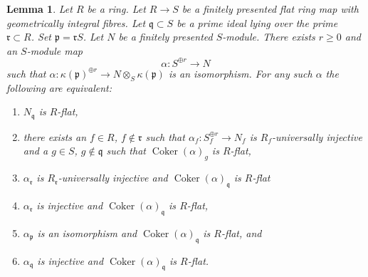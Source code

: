 \documentclass{amsart}
\theoremstyle{plain}
\newtheorem{lemma}[subsection]{Lemma}
\theoremstyle{definition}
\theoremstyle{remark}
\numberwithin{equation}{subsection}
\def\Coker{\mathop{\mathrm{Coker}}}
\begin{document}
\begin{lemma}
\label{lemma-induction-step-fp}
Let $R$ be a ring. Let $R \to S$ be a finitely presented
flat ring map with geometrically integral fibres. Let
$\mathfrak q \subset S$ be a prime ideal lying over the prime
$\mathfrak r \subset R$. Set $\mathfrak p = \mathfrak r S$.
Let $N$ be a finitely presented $S$-module.
There exists $r \geq 0$ and an $S$-module map
$$
\alpha : S^{\oplus r} \longrightarrow N
$$
such that
$\alpha : \kappa(\mathfrak p)^{\oplus r} \to N \otimes_S \kappa(\mathfrak p)$
is an isomorphism. For any such $\alpha$ the following are equivalent:
\begin{enumerate}
\item $N_{\mathfrak q}$ is $R$-flat,
\item there exists an $f \in R$, $f \not \in \mathfrak r$ such that
$\alpha_f : S_f^{\oplus r} \to N_f$ is $R_f$-universally injective and
a $g \in S$, $g \not \in \mathfrak q$ such that $\Coker(\alpha)_g$
is $R$-flat,
\item $\alpha_{\mathfrak r}$ is $R_{\mathfrak r}$-universally injective and
$\Coker(\alpha)_{\mathfrak q}$ is $R$-flat
\item $\alpha_{\mathfrak r}$ is injective and
$\Coker(\alpha)_{\mathfrak q}$ is $R$-flat,
\item $\alpha_{\mathfrak p}$ is an isomorphism and
$\Coker(\alpha)_{\mathfrak q}$ is $R$-flat, and
\item $\alpha_{\mathfrak q}$ is injective and
$\Coker(\alpha)_{\mathfrak q}$ is $R$-flat.
\end{enumerate}
\end{lemma}
\end{document}
